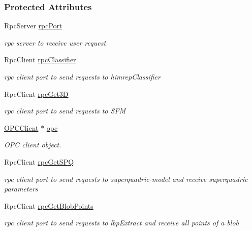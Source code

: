 \subsubsection*{Protected Attributes}
\begin{DoxyCompactItemize}
\item 
Rpc\+Server \hyperlink{group__iol2opc_af1f97807672a82261e98cde725ac02ff}{rpc\+Port}
\begin{DoxyCompactList}\small\item\em rpc server to receive user request \end{DoxyCompactList}\item 
Rpc\+Client \hyperlink{group__iol2opc_a970d4bb81398fe86064d8b27061689a2}{rpc\+Classifier}
\begin{DoxyCompactList}\small\item\em rpc client port to send requests to himrep\+Classifier \end{DoxyCompactList}\item 
Rpc\+Client \hyperlink{group__iol2opc_a82ce504b5a096979977bbb8d28a362d7}{rpc\+Get3D}
\begin{DoxyCompactList}\small\item\em rpc client port to send requests to S\+FM \end{DoxyCompactList}\item 
\hyperlink{group__icubclient__clients_classicubclient_1_1OPCClient}{O\+P\+C\+Client} $\ast$ \hyperlink{group__iol2opc_a7a2a1ed53d1b52114f98257b2576ff23}{opc}
\begin{DoxyCompactList}\small\item\em O\+PC client object. \end{DoxyCompactList}\item 
Rpc\+Client \hyperlink{group__iol2opc_af7d4fdfb04c11e6b385bb69624765005}{rpc\+Get\+S\+PQ}
\begin{DoxyCompactList}\small\item\em rpc client port to send requests to superquadric-\/model and receive superquadric parameters \end{DoxyCompactList}\item 
Rpc\+Client \hyperlink{group__iol2opc_a55365e238335fce2ec65e63885968926}{rpc\+Get\+Blob\+Points}
\begin{DoxyCompactList}\small\item\em rpc client port to send requests to lbp\+Extract and receive all points of a blob \end{DoxyCompactList}\item 

\end{DoxyCompactItemize}

